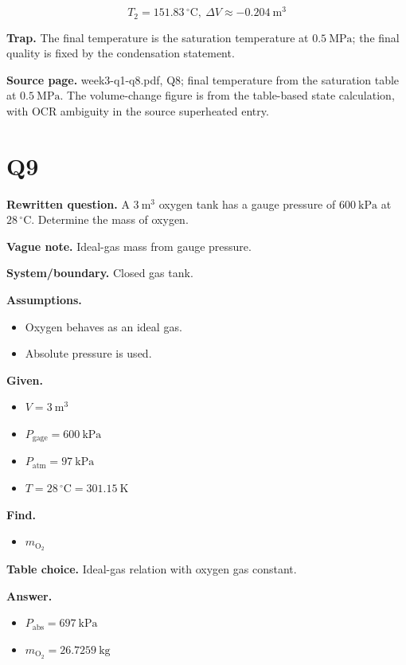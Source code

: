 \[\boxed{T_2 = 151.83\,^{\circ}\mathrm{C},\ \Delta V \approx -0.204\ \mathrm{m^3}}\]

\textbf{Trap.} The final temperature is the saturation temperature at $0.5\ \mathrm{MPa}$; the final quality is fixed by the condensation statement.

\textbf{Source page.} week3-q1-q8.pdf, Q8; final temperature from the saturation table at $0.5\ \mathrm{MPa}$. The volume-change figure is from the table-based state calculation, with OCR ambiguity in the source superheated entry.

\section*{Q9}
\textbf{Rewritten question.} A $3\ \mathrm{m^3}$ oxygen tank has a gauge pressure of $600\ \mathrm{kPa}$ at $28\,^{\circ}\mathrm{C}$. Determine the mass of oxygen.

\textbf{Vague note.} Ideal-gas mass from gauge pressure.

\textbf{System/boundary.} Closed gas tank.

\textbf{Assumptions.}
\begin{itemize}
  \item Oxygen behaves as an ideal gas.
  \item Absolute pressure is used.
\end{itemize}

\textbf{Given.}
\begin{itemize}
  \item $V = 3\ \mathrm{m^3}$
  \item $P_{\mathrm{gage}} = 600\ \mathrm{kPa}$
  \item $P_{\mathrm{atm}} = 97\ \mathrm{kPa}$
  \item $T = 28\,^{\circ}\mathrm{C} = 301.15\ \mathrm{K}$
\end{itemize}

\textbf{Find.}
\begin{itemize}
  \item $m_{\mathrm{O_2}}$
\end{itemize}

\textbf{Table choice.} Ideal-gas relation with oxygen gas constant.

\textbf{Answer.}
\begin{itemize}
  \item $P_{\mathrm{abs}} = 697\ \mathrm{kPa}$
  \item $m_{\mathrm{O_2}} = 26.7259\ \mathrm{kg}$
\end{itemize}

